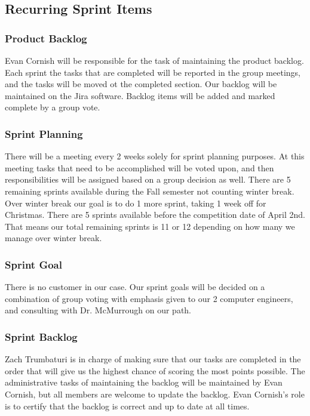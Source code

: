 \subsection{Recurring Sprint Items}


\subsubsection{Product Backlog}
Evan Cornish will be responsible for the task of maintaining the product backlog. Each sprint the tasks that are completed will be reported in the group meetings, and the tasks will be moved ot the completed section.
Our backlog will be maintained on the Jira software. Backlog items will be added and marked complete by a group vote. 

\subsubsection{Sprint Planning}
There will be a meeting every 2 weeks solely for sprint planning purposes. At this meeting tasks that need to be accomplished will be voted upon, and then responsibilities will be assigned based on a group decision as well.
There are 5 remaining sprints available during the Fall semester not counting winter break. Over winter break our goal is to do 1 more sprint, taking 1 week off for Christmas.
There are 5 sprints available before the competition date of April 2nd. That means our total remaining sprints is 11 or 12 depending on how many we manage over winter break.

\subsubsection{Sprint Goal}
There is no customer in our case. Our sprint goals will be decided on a combination of group voting with emphasis given to our 2 computer engineers, and consulting with Dr. McMurrough on our path.

\subsubsection{Sprint Backlog}
Zach Trumbaturi is in charge of making sure that our tasks are completed in the order that will give us the highest chance of scoring the most points possible. The administrative tasks of maintaining the backlog will be maintained by Evan Cornish, but all members are welcome to update the backlog. Evan Cornish's role is to certify that the backlog is correct and up to date at all times.

